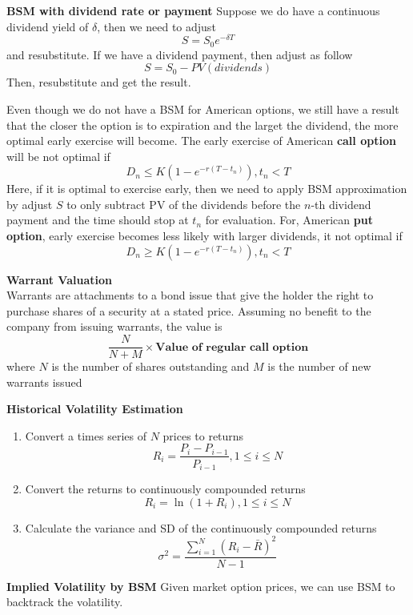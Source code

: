 \documentclass[11pt,fleqn]{book} %
\numberwithin{equation}{section} %
\numberwithin{figure}{section} %
\numberwithin{table}{section} %
\begin{document}
 \begin{theorem}\textbf{BSM with dividend rate or payment}
 Suppose we do have a continuous dividend yield of $\delta$, then we need to adjust
 $$
 S=S_0e^{-\delta T}
 $$
 and resubstitute. If we have a dividend payment, then adjust as follow
 $$
 S=S_0-PV(dividends)
 $$
 Then, resubstitute and get the result.
 \end{theorem}
 \begin{remark}
 Even though we do not have a BSM for American options, we still have a result that the closer the option is to expiration and the larget the dividend, the more optimal early exercise will become. The early exercise of American \textbf{call option }will be not optimal if
 $$
 D_n\leq K(1-e^{-r(T-t_n)}),t_n<T
 $$
 Here, if it is optimal to exercise early, then we need to apply BSM approximation by adjust $S$ to only subtract PV of the dividends before the $n$-th dividend payment and the time should stop at $t_n$ for evaluation. For, American \textbf{put option}, early exercise becomes less likely with larger dividends, it not optimal if
 $$
 D_n\geq K(1-e^{-r(T-t_n)}),t_n<T
 $$
 \end{remark}
 \begin{theorem}\textbf{Warrant Valuation}\\
 Warrants are attachments to a bond issue that give the holder the right to purchase shares of a security at a stated price. Assuming no benefit to the company from issuing warrants, the value is
 $$
 \frac{N}{N+M}\times\textbf{Value of regular call option}
 $$
 where $N$ is the number of shares outstanding and $M$ is the number of new warrants issued
 \end{theorem}
 \begin{definition}\textbf{Historical Volatility Estimation}
 \begin{enumerate}
     \item Convert a times series of $N$ prices to returns
     $$
     R_i=\frac{P_i-P_{i-1}}{P_{i-1}},1\leq i\leq N
     $$
     \item Convert the returns to continuously compounded returns
     $$
     R_i=\ln(1+R_i),1\leq i\leq N
     $$
     \item Calculate the variance and SD of the continuously compounded returns
     $$
     \sigma^2=\frac{\sum_{i=1}^N(R_{i}-\bar{R})^2}{N-1}
     $$
 \end{enumerate}
 \end{definition}
 \begin{theorem}\textbf{Implied Volatility by BSM}
 Given market option prices, we can use BSM to backtrack the volatility.
 \end{theorem}
\end{document}
